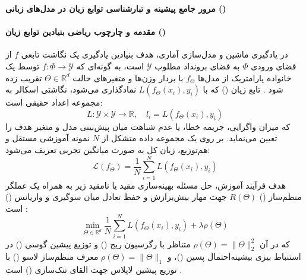 \item \textbf{مرور جامع پیشینه و تبارشناسی توابع زیان در مدل‌های زبانی ()}

\paragraph*{مقدمه و چارچوب ریاضی بنیادین توابع زیان ()}
در یادگیری ماشین و مدل‌سازی آماری، هدف بنیادین یادگیری یک نگاشت تابعی $f$ از فضای ورودی $\Phi$ به فضای برونداد مطلوب $\mathcal{Y}$ است، به گونه‌ای که $f: \Phi \to \mathcal{Y}$ توسط یک خانواده پارامتریک از مدل‌ها $f_\Theta$ با بردار وزن‌ها و متغیرهای حالت $\Theta \in \mathbb{R}^d$ تقریب زده شود \cite{ciampiconi2024survey}. تابع زیان () که با $L(f_\Theta(x_i), y_i)$ نمادگذاری می‌شود، نگاشتی اسکالر به مجموعه اعداد حقیقی است:
\begin{equation}
    L: \mathcal{Y} \times \mathcal{Y} \to \mathbb{R}, \quad l_i = L(f_\Theta(x_i), y_i)
\end{equation}
که میزان واگرایی، جریمه خطا، یا عدم شباهت میان پیش‌بینی مدل و متغیر هدف را تعیین می‌نماید. بر روی یک مجموعه داده متشکل از $N$ نمونه آموزشی مستقل و هم‌توزیع، زیان کل به صورت میانگین تجربی تعریف می‌شود:
\begin{equation}
    \mathcal{L}(f_\Theta) = \frac{1}{N} \sum_{i=1}^N L(f_\Theta(x_i), y_i)
\end{equation}
هدف فرآیند آموزش، حل مسئله بهینه‌سازی مقید یا نامقید زیر به همراه یک عملگر منظم‌ساز () $R(\Theta)$ جهت مهار بیش‌برازش و حفظ تعادل میان سوگیری و واریانس () است \cite{ciampiconi2024survey, terven2025comprehensive}:
\begin{equation}
    \min_{\Theta \in \mathbb{R}^d} \frac{1}{N} \sum_{i=1}^N L(f_\Theta(x_i), y_i) + \lambda \rho(\Theta)
\end{equation}
که در آن $\rho(\Theta) = \|\Theta\|_2^2$ متناظر با رگرسیون ریج () و توزیع پیشین گوسی () در استنباط بیزی بیشینه‌احتمال پسین ()، و $\rho(\Theta) = \|\Theta\|_1$ معرف منظم‌ساز لاسو () با توزیع پیشین لاپلاس جهت القای تنک‌سازی () است \cite{ciampiconi2024survey}.

